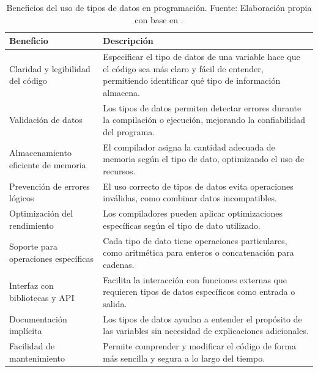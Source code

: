 \begin{table}[H]
    \centering
    \begin{tabular}{|p{5cm}|p{9cm}|}
        \hline
        \textbf{Beneficio} & \textbf{Descripción} \\
        \hline
        
        Claridad y legibilidad del código & Especificar el tipo de datos de una variable hace que el código sea más claro y fácil de entender, permitiendo identificar qué tipo de información almacena. \\
        \hline
        
        Validación de datos & Los tipos de datos permiten detectar errores durante la compilación o ejecución, mejorando la confiabilidad del programa. \\
        \hline
        
        Almacenamiento eficiente de memoria & El compilador asigna la cantidad adecuada de memoria según el tipo de dato, optimizando el uso de recursos. \\
        \hline
        
        Prevención de errores lógicos & El uso correcto de tipos de datos evita operaciones inválidas, como combinar datos incompatibles. \\
        \hline
        
        Optimización del rendimiento & Los compiladores pueden aplicar optimizaciones específicas según el tipo de dato utilizado. \\
        \hline
        
        Soporte para operaciones específicas & Cada tipo de dato tiene operaciones particulares, como aritmética para enteros o concatenación para cadenas. \\
        \hline
        
        Interfaz con bibliotecas y API & Facilita la interacción con funciones externas que requieren tipos de datos específicos como entrada o salida. \\
        \hline
        
        Documentación implícita & Los tipos de datos ayudan a entender el propósito de las variables sin necesidad de explicaciones adicionales. \\
        \hline
        
        Facilidad de mantenimiento & Permite comprender y modificar el código de forma más sencilla y segura a lo largo del tiempo. \\
        \hline
    \end{tabular}
    \caption{Beneficios del uso de tipos de datos en programación. Fuente: Elaboración propia con base en \cite{frem_ref1}.}
    \label{tab:beneficios_tipos_datos}
\end{table}

